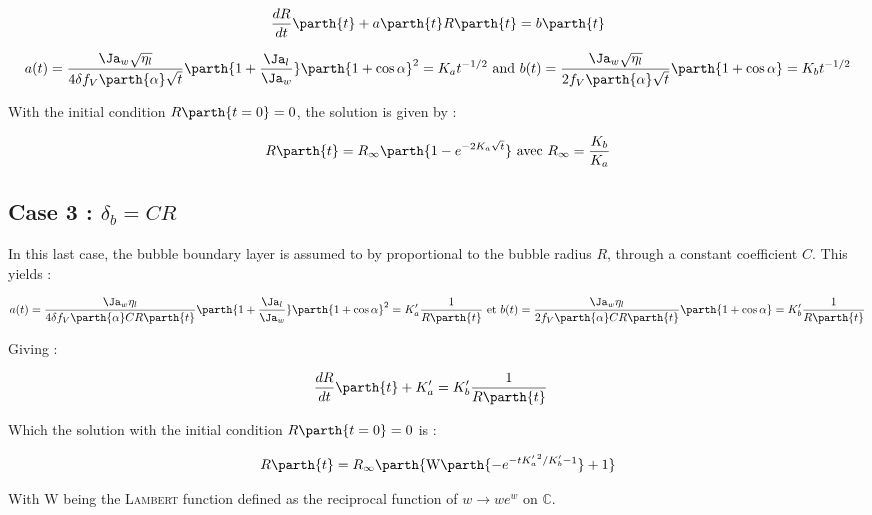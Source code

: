 \begin{align}
\frac{dR}{dt}\parth{t}+a\parth{t}R\parth{t}=b\parth{t}
\end{align}

\begin{align}
\label{eq:coeff_expgrowth}
a(t)=\frac{\Ja_{w}\sqrt{\eta_{l}}}{4\delta f_{V}\parth{\alpha}\sqrt{t}}\parth{1+\frac{\Ja_{l}}{\Ja_{w}}}\parth{1+\cos{\alpha}}^{2}=K_{a}t^{-1/2} \text{ and } b(t)=\frac{\Ja_{w}\sqrt{\eta_{l}}}{2f_{V}\parth{\alpha}\sqrt{t}}\parth{1+\cos{\alpha}}=K_ {b}t^{-1/2}
\end{align}

With the initial condition $R\parth{t=0}=0$, the solution is given by : 

\begin{align}
R\parth{t}=R_{\infty}\parth{1-e^{-2K_{a}\sqrt{t}}} \text{ avec } R_{\infty}=\frac{K_{b}}{K_{a}}
\end{align}

\npar
\subsection{Case 3 : $\delta_{b}=CR$}
\npar

In this last case, the bubble boundary layer is assumed to by proportional to the bubble radius $R$, through a constant coefficient $C$. This yields :


\begin{align}
a(t)=\frac{\Ja_{w}\eta_{l}}{4\delta f_{V}\parth{\alpha}CR\parth{t}}\parth{1+\frac{\Ja_{l}}{\Ja_{w}}}\parth{1+\cos{\alpha}}^{2}=K'_{a}\frac{1}{R\parth{t}} \text{ et } b(t)=\frac{\Ja_{w}\eta_{l}}{2f_{V}\parth{\alpha}CR\parth{t}}\parth{1+\cos{\alpha}}=K'_ {b}\frac{1}{R\parth{t}}
\end{align}

Giving :

\begin{align}
&\frac{dR}{dt}\parth{t} + K'_{a} = K'_{b}\frac{1}{R\parth{t}}
\end{align}

Which the solution with the initial condition $R\parth{t=0}=0$ is :

\begin{align}
R\parth{t}=R_{\infty}\parth{ \text{W}\parth{-e^{-t{K'_{a}}^{2}/K'_{b}-1} } +1}
\end{align}

With $\text{W}$ being the \textsc{Lambert} function defined as the reciprocal function of $w \rightarrow we^{w}$ on $\mathbb{C}$.
